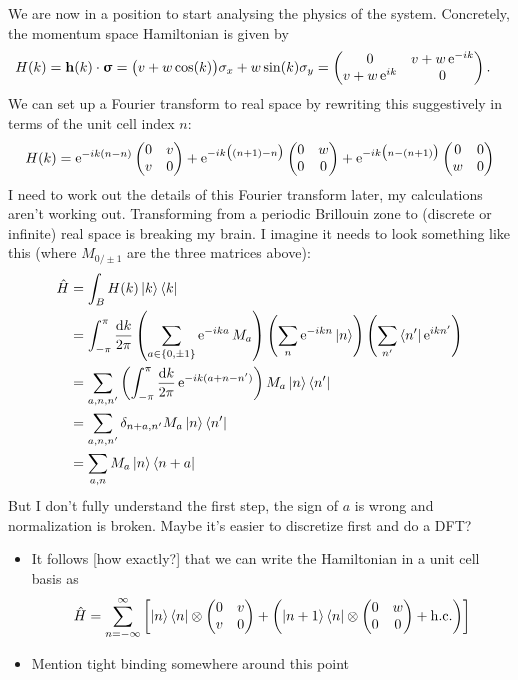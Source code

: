 We are now in a position to start analysing the physics of the system. Concretely, the momentum space Hamiltonian is given by
\begin{align*}
	H(k) &= \vb{h}(k)\cdot\bm{\upsigma} = \big(v + w\cos(k)\big)\sigma_x + w\sin(k)\sigma_y = \begin{pmatrix}
		0 & v + w\operatorname{e}^{-ik} \\
		v + w\operatorname{e}^{ik} & 0
	\end{pmatrix}.
\end{align*}
We can set up a Fourier transform to real space by rewriting this suggestively in terms of the unit cell index $n$:
\[
	H(k) = \operatorname{e}^{-ik(n-n)}\begin{pmatrix}
		0 & v \\
		v & 0
	\end{pmatrix} + \operatorname{e}^{-ik\big((n+1)-n\big)}\begin{pmatrix}
		0 & w \\
		0 & 0
	\end{pmatrix} + \operatorname{e}^{-ik\big(n-(n+1)\big)}\begin{pmatrix}
		0 & 0 \\
		w & 0
	\end{pmatrix}
\]
{\color{red} I need to work out the details of this Fourier transform later, my calculations aren't working out. Transforming from a periodic Brillouin zone to (discrete or infinite) real space is breaking my brain. I imagine it needs to look something like this (where $M_{0/\pm1}$ are the three matrices above):
\begin{align*}
	\hat{H} &= \int_B H(k) \ket{k}\bra{k} \\
		&= \int_{-\pi}^{\pi}\frac{\dd{k}}{2\pi} \left(\sum_{a\in\{0,\pm1\}}\operatorname{e}^{-ika}M_a\right) \left(\sum_{n}\operatorname{e}^{-ikn}\ket{n}\right) \left(\sum_{n'}\bra{n'}\operatorname{e}^{ikn'}\right) \\
		&= \sum_{a,n,n'}\left(\int_{-\pi}^{\pi}\frac{\dd{k}}{2\pi}\operatorname{e}^{-ik(a+n-n')}\right)M_a\ket{n}\bra{n'} \\
		&= \sum_{a,n,n'}\delta_{n+a,n'}M_a\ket{n}\bra{n'} \\
		&= \sum_{a,n}M_a\ket{n}\bra{n+a}
\end{align*}
But I don't fully understand the first step, the sign of $a$ is wrong and normalization is broken. Maybe it's easier to discretize first and do a DFT?}

{\color{blue}
\begin{itemize}
	\item It follows [how exactly?] that we can write the Hamiltonian in a unit cell basis as
	\[
		\hat{H} = \sum_{n=-\infty}^{\infty}\left[\ket{n}\bra{n}\otimes\begin{pmatrix}
			0 & v \\
			v & 0
		\end{pmatrix} + \left(\ket{n+1}\bra{n}\otimes\begin{pmatrix}
			0 & w \\
			0 & 0
		\end{pmatrix} + {\rm h.c.}\right)\right]
	\]
	
	\item Mention tight binding somewhere around this point
\end{itemize}
}

